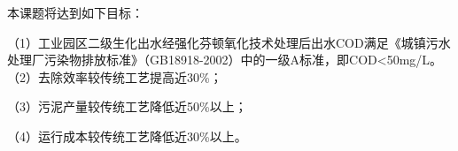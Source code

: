 本课题将达到如下目标：\par
（1）工业园区二级生化出水经强化芬顿氧化技术处理后出水COD满足《城镇污水处理厂污染物排放标准》（GB18918-2002）中的一级A标准，即COD<50mg/L。
（2）去除效率较传统工艺提高近30\%；\par
（3）污泥产量较传统工艺降低近50\%以上；\par
（4）运行成本较传统工艺降低近30\%以上。\par
